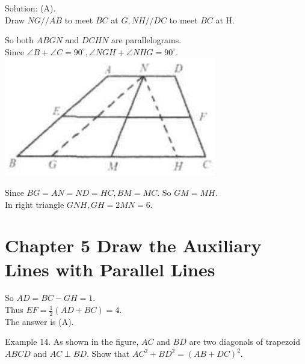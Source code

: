 \documentclass[10pt]{article}
\begin{document}
Solution: (A).\\
Draw \(N G / / A B\) to meet \(B C\) at \(G, N H / / D C\) to meet \(B C\) at H.

So both \(A B G N\) and \(D C H N\) are parallelograms.\\
Since \(\angle B+\angle C=90^{\circ}, \angle N G H+\angle N H G=90^{\circ}\).\\
\includegraphics[max width=\textwidth, center]{2025_04_17_97bc1f7e44d93c271a88g-116(1)}

Since \(B G=A N=N D=H C, B M=M C\). So \(G M=M H\).\\
In right triangle \(G N H, G H=2 M N=6\).

\section*{Chapter 5 Draw the Auxiliary Lines with Parallel Lines}
So \(A D=B C-G H=1\).\\
Thus \(E F=\frac{1}{2}(A D+B C)=4\).\\
The answer is (A).

Example 14. As shown in the figure, \(A C\) and \(B D\) are two diagonals of trapezoid \(A B C D\) and \(A C \perp B D\). Show that \(A C^{2}+B D^{2}=(A B+D C)^{2}\).
\end{document}
